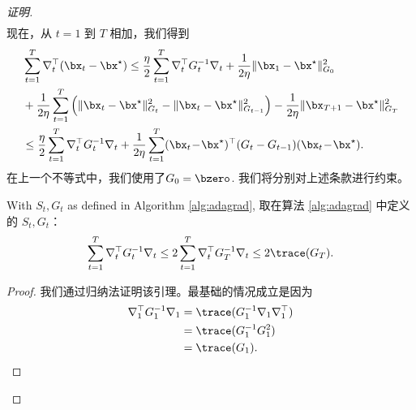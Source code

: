 \begin{proof}[证明]
\begin{align*}
\end{align*}
现在，从 $t=1$ 到 $T$ 相加，我们得到
\begin{align}  \label{eqn:adagrad-shalom}
&\sum_{t=1}^T \nabla_t^\top (\bx_t - \bx^\star)
 \leq \frac{\eta}{2} \sum_{t=1}^T \nabla_t^\top G_t^{-1} \nabla_t +
\frac{1}{2\eta}  \| \bx_{1} - \bx^\star \|_{G_{0}}^2  \\
& + \frac{1}{2 \eta} \sum_{t=1}^T  \left( \| \bx_{t} - \bx^\star \|_{G_t}^2 - \| \bx_{t} - \bx^\star \|_{G_{t-1}}^2 \right)   - \frac{1}{2 \eta} \| \bx_{T+1}   - \bx^\star \|_{G_{T}}^2  \notag \\
&\leq \frac{\eta}{2} \sum_{t=1}^T \nabla_t^\top G_t^{-1}
\nabla_t + \frac{1}{2\eta} \sum_{t=1}^{T} (\bx_t\! -\! \bx^\star)^\top
(G_t - G_{t-1} ) (\bx_t\! -\! \bx^\star) . \notag
\end{align}
在上一个不等式中，我们使用了$G_0 = \bzero $.%
我们将分别对上述条款进行约束。

\begin{lemma}
\label{lemma:trace-bound-adagrad}
With  $S_t,G_t$  as defined in Algorithm \ref{alg:adagrad},
取在算法 \ref{alg:adagrad} 中定义的 $S_t,G_t$：
\begin{equation*}
\sum_{t=1}^T \nabla_t^\top  G_t^{-1} \nabla_t \le 2 \sum_{t=1}^T \nabla_t^\top G_T^{-1} \nabla_t \leq  2\trace(G_T). 
\end{equation*}
\end{lemma}
\begin{proof}
我们通过归纳法证明该引理。最基础的情况成立是因为
\begin{align*}
\nabla_1^\top G_1^{-1}  \nabla_1  & = \trace( G_1^{-1}  \nabla_1 \nabla_1^\top) \\
& =   \trace  (G_1^{-1}  G_1^2 ) \\
& =  \trace(G_1). 
\end{align*}



\end{proof}
\end{proof}
